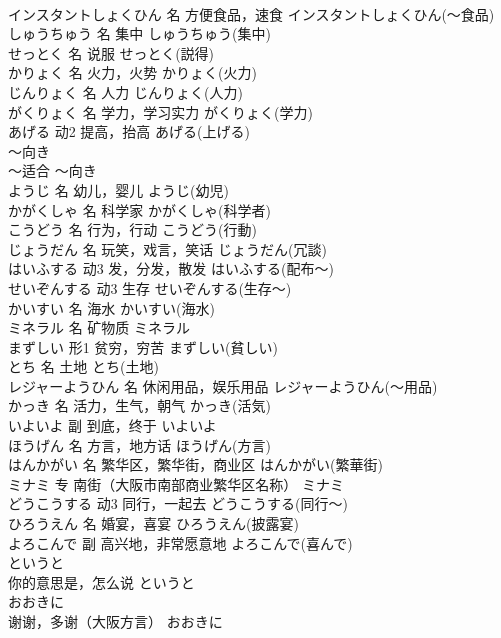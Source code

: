 \documentclass[8pt]{extreport}
\begin{document}
\begin{CJK}{UTF8}{min}
\\	インスタントしょくひん	名	方便食品，速食	インスタントしょくひん(～食品)	
\\	しゅうちゅう	名	集中	しゅうちゅう(集中)	
\\	せっとく	名	说服	せっとく(説得)	
\\	かりょく	名	火力，火势	かりょく(火力)	
\\	じんりょく	名	人力	じんりょく(人力)	
\\	がくりょく	名	学力，学习实力	がくりょく(学力)	
\\	あげる	动2	提高，抬高	あげる(上げる)	
\\	～向き	
\\	～适合	～向き	
\\	ようじ	名	幼儿，婴儿	ようじ(幼児)	
\\	かがくしゃ	名	科学家	かがくしゃ(科学者)	
\\	こうどう	名	行为，行动	こうどう(行動)	
\\	じょうだん	名	玩笑，戏言，笑话	じょうだん(冗談)	
\\	はいふする	动3	发，分发，散发	はいふする(配布～)	
\\	せいぞんする	动3	生存	せいぞんする(生存～)	
\\	かいすい	名	海水	かいすい(海水)	
\\	ミネラル	名	矿物质	ミネラル	
\\	まずしい	形1	贫穷，穷苦	まずしい(貧しい)	
\\	とち	名	土地	とち(土地)	
\\	レジャーようひん	名	休闲用品，娱乐用品	レジャーようひん(～用品)	
\\	かっき	名	活力，生气，朝气	かっき(活気)	
\\	いよいよ	副	到底，终于	いよいよ	
\\	ほうげん	名	方言，地方话	ほうげん(方言)	
\\	はんかがい	名	繁华区，繁华街，商业区	はんかがい(繁華街)	
\\	ミナミ	专	南街（大阪市南部商业繁华区名称）	ミナミ	
\\	どうこうする	动3	同行，一起去	どうこうする(同行～)	
\\	ひろうえん	名	婚宴，喜宴	ひろうえん(披露宴)	
\\	よろこんで	副	高兴地，非常愿意地	よろこんで(喜んで)	
\\	というと	
\\	你的意思是，怎么说	というと	
\\	おおきに	
\\	谢谢，多谢（大阪方言）	おおきに	

\end{CJK}
\end{document}
